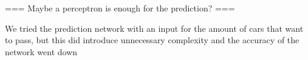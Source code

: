 === Maybe a perceptron is enough for the prediction? ===

We tried the prediction network with an input for the amount of cars that want to pass, but this did introduce unnecessary complexity and the accuracy of the network went down